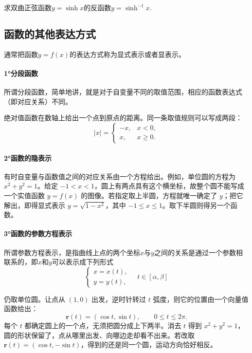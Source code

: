 求双曲正弦函数\(y = \sinh x\)的反函数\(y = \sinh^{- 1} x\).


\subsection{函数的其他表达方式}
通常把函数\(y = f(x)\)的表达方式称为显式表示或者显表示。

\paragraph{1°分段函数} 所谓分段函数，简单地讲，就是对于自变量不同的取值范围，相应的函数表达式（即对应关系）不同。

绝对值函数在数轴上给出一个点到原点的距离。同一条取值规则可以写成两段：
\[
 |x|=\begin{cases}-x,&x<0,\\ x,&x\geq 0.\end{cases}
\]

\paragraph{2°函数的隐表示} 有时自变量与函数值之间的对应关系由一个方程给出。例如，单位圆的方程为 \(x^2+y^2=1\)。给定 \(-1<x<1\)，圆上有两点具有这个横坐标，故整个圆不能写成一个实值函数 \(y=f(x)\) 的图像。若指定取上半圆，方程就唯一确定了 \(y\)；把它解出，即得显式表示 \(y=\sqrt{1-x^2}\)，其中 \(-1\leq x\leq 1\)。取下半圆则得另一个函数。

\paragraph{3°函数的参数方程表示} 所谓参数方程表示，是指曲线上点的两个坐标\(x\)与\(y\)之间的关系是通过一个参数相联系的，即\(x\)和\(y\)可以表示成下列形式
\begin{equation}
\left\{ \begin{matrix}x = x(t) , \\ y = y(t) ,\end{matrix} \quad t \in \left[ \alpha , \beta \right] \right.
\end{equation}

仍取单位圆。让点从 \((1,0)\) 出发，逆时针转过 \(t\) 弧度，则它的位置由一个向量值函数给出：
\[
 \mathbf r(t)=(\cos t,\sin t),\qquad 0\leq t\leq 2\pi .
\]
每个 \(t\) 都确定圆上的一个点，无须把圆分成上下两半。消去 \(t\) 得到 \(x^2+y^2=1\)，圆的形状保留了，点从哪里出发、向哪边走却看不出来。若改取 \(\mathbf r(t)=(\cos t,-\sin t)\)，得到的还是同一个圆，运动方向恰好相反。

